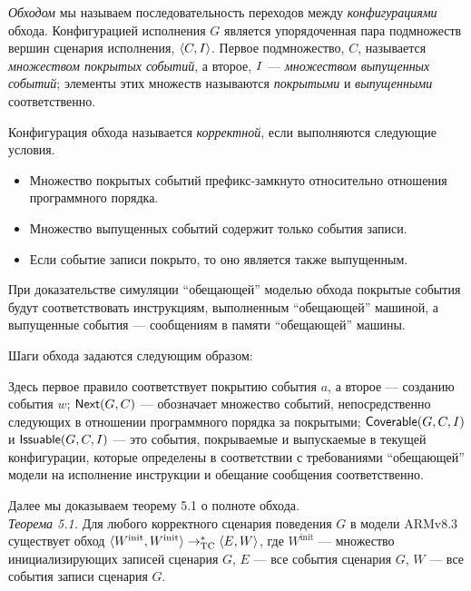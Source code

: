\emph{Обходом} мы называем последовательность переходов между \emph{конфигурациями} обхода. Конфигурацией исполнения $G$ является
упорядоченная пара подмножеств вершин сценария исполнения, ${\langle{C, I}\rangle}$.
Первое подмножество, $C$, называется \emph{множеством покрытых событий}, а второе, $I$ --- \emph{множеством выпущенных событий};
элементы этих множеств называются \emph{покрытыми} и \emph{выпущенными} соответственно.

Конфигурация обхода называется \emph{корректной}, если выполняются следующие условия.
\begin{itemize}
  \item Множество покрытых событий префикс-замкнуто относительно отношения программного порядка.
  \item Множество выпущенных событий содержит только события записи.
  \item Если событие записи покрыто, то оно является также выпущенным.
\end{itemize}
При доказательстве симуляции ``обещающей'' моделью обхода покрытые события будут соответствовать инструкциям, выполненным
``обещающей'' машиной, а выпущенные события --- сообщениям в памяти ``обещающей'' машины.

Шаги обхода задаются следующим образом:
Здесь первое правило соответствует покрытию события $a$, а второе --- созданию события $w$; ${\sf Next}(G, C)$ --- обозначает множество событий,
непосредственно следующих в отношении программного порядка за покрытыми; ${\sf Coverable}(G, C, I)$ и ${\sf Issuable}(G, C, I)$ --- это
события, покрываемые и выпускаемые в текущей конфигурации, которые определены в соответствии с требованиями ``обещающей'' модели
на исполнение инструкции и обещание сообщения соответственно.

Далее мы доказываем теорему 5.1 о полноте обхода. \\
\emph{Теорема 5.1.} Для любого корректного сценария поведения $G$ в модели ARMv8.3 существует обход
${\langle{W^{\textrm{init}}, W^{\textrm{init}}}\rangle} \rightarrow_{\rm TC}^{*} {\langle{E, W}\rangle}$,
где $W^{\textrm{init}}$ --- множество инициализирующих записей сценария $G$, $E$ --- все события сценария $G$,
$W$ --- все события записи сценария $G$.

